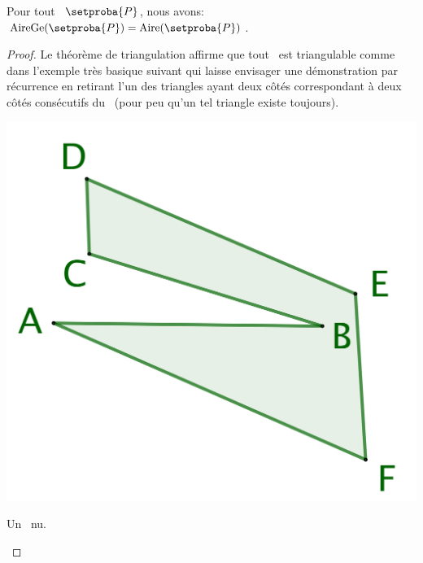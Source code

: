     


\begin{fact}
    Pour tout \ngone\ $\setproba{P}$, nous avons: $\garea{\setproba{P}} = \area{\setproba{P}}$.
\end{fact}


\begin{proof}
    Le théorème de triangulation affirme que tout \ngone\ est triangulable comme dans l'exemple très basique suivant qui laisse envisager une démonstration par récurrence en retirant l'un des triangles ayant deux côtés correspondant à deux côtés consécutifs du \ngone\ (pour peu qu'un tel triangle existe toujours).

    
    \begin{multicols}{3}
        \small\itshape
        \begin{center}
            \includegraphics[scale=.4]{content/polygon/sufficient-cond/triangulation-1.png}
        
            \smallskip
            Un \ngone\ nu.
        \end{center}


\end{multicols}
\end{proof}
